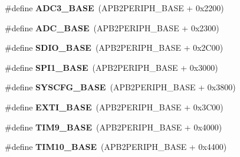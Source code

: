 \begin{DoxyCompactItemize}
\item 
\hypertarget{group___peripheral__memory__map_gaca766f86c8e0b00a8e2b0224dcbb4c82}{\#define {\bfseries A\-D\-C3\-\_\-\-B\-A\-S\-E}~(A\-P\-B2\-P\-E\-R\-I\-P\-H\-\_\-\-B\-A\-S\-E + 0x2200)}\label{group___peripheral__memory__map_gaca766f86c8e0b00a8e2b0224dcbb4c82}

\item 
\hypertarget{group___peripheral__memory__map_gad06cb9e5985bd216a376f26f22303cd6}{\#define {\bfseries A\-D\-C\-\_\-\-B\-A\-S\-E}~(A\-P\-B2\-P\-E\-R\-I\-P\-H\-\_\-\-B\-A\-S\-E + 0x2300)}\label{group___peripheral__memory__map_gad06cb9e5985bd216a376f26f22303cd6}

\item 
\hypertarget{group___peripheral__memory__map_ga95dd0abbc6767893b4b02935fa846f52}{\#define {\bfseries S\-D\-I\-O\-\_\-\-B\-A\-S\-E}~(A\-P\-B2\-P\-E\-R\-I\-P\-H\-\_\-\-B\-A\-S\-E + 0x2\-C00)}\label{group___peripheral__memory__map_ga95dd0abbc6767893b4b02935fa846f52}

\item 
\hypertarget{group___peripheral__memory__map_ga50cd8b47929f18b05efbd0f41253bf8d}{\#define {\bfseries S\-P\-I1\-\_\-\-B\-A\-S\-E}~(A\-P\-B2\-P\-E\-R\-I\-P\-H\-\_\-\-B\-A\-S\-E + 0x3000)}\label{group___peripheral__memory__map_ga50cd8b47929f18b05efbd0f41253bf8d}

\item 
\hypertarget{group___peripheral__memory__map_ga62246020bf3b34b6a4d8d0e84ec79d3d}{\#define {\bfseries S\-Y\-S\-C\-F\-G\-\_\-\-B\-A\-S\-E}~(A\-P\-B2\-P\-E\-R\-I\-P\-H\-\_\-\-B\-A\-S\-E + 0x3800)}\label{group___peripheral__memory__map_ga62246020bf3b34b6a4d8d0e84ec79d3d}

\item 
\hypertarget{group___peripheral__memory__map_ga87371508b3bcdcd98cd1ec629be29061}{\#define {\bfseries E\-X\-T\-I\-\_\-\-B\-A\-S\-E}~(A\-P\-B2\-P\-E\-R\-I\-P\-H\-\_\-\-B\-A\-S\-E + 0x3\-C00)}\label{group___peripheral__memory__map_ga87371508b3bcdcd98cd1ec629be29061}

\item 
\hypertarget{group___peripheral__memory__map_ga92ae902be7902560939223dd765ece08}{\#define {\bfseries T\-I\-M9\-\_\-\-B\-A\-S\-E}~(A\-P\-B2\-P\-E\-R\-I\-P\-H\-\_\-\-B\-A\-S\-E + 0x4000)}\label{group___peripheral__memory__map_ga92ae902be7902560939223dd765ece08}

\item 
\hypertarget{group___peripheral__memory__map_ga3eff32f3801db31fb4b61d5618cad54a}{\#define {\bfseries T\-I\-M10\-\_\-\-B\-A\-S\-E}~(A\-P\-B2\-P\-E\-R\-I\-P\-H\-\_\-\-B\-A\-S\-E + 0x4400)}\label{group___peripheral__memory__map_ga3eff32f3801db31fb4b61d5618cad54a}


\end{DoxyCompactItemize}
